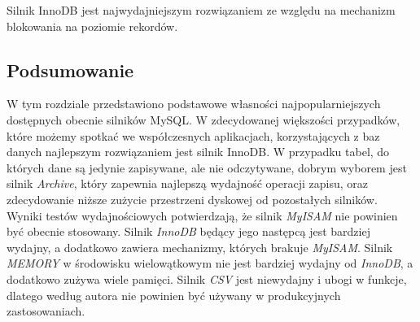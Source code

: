 Silnik InnoDB jest najwydajniejszym rozwiązaniem ze względu na mechanizm blokowania na poziomie rekordów.



\subsection{Podsumowanie}

W tym rozdziale przedstawiono podstawowe własności najpopularniejszych dostępnych obecnie silników MySQL. W zdecydowanej większości przypadków, które możemy spotkać we współczesnych aplikacjach, korzystających z baz danych najlepszym rozwiązaniem jest silnik InnoDB. W przypadku tabel, do których dane są jedynie zapisywane, ale nie odczytywane, dobrym wyborem jest silnik \textit{Archive}, który zapewnia najlepszą wydajność operacji zapisu, oraz zdecydowanie niższe zużycie przestrzeni dyskowej od pozostałych silników. Wyniki testów wydajnościowych potwierdzają, że silnik \textit{MyISAM} nie powinien być obecnie stosowany. Silnik \textit{InnoDB} będący jego następcą jest bardziej wydajny, a dodatkowo zawiera mechanizmy, których brakuje \textit{MyISAM}. Silnik \textit{MEMORY} w środowisku wielowątkowym nie jest bardziej wydajny od \textit{InnoDB}, a dodatkowo zużywa wiele pamięci. Silnik \textit{CSV} jest niewydajny i ubogi w funkcje, dlatego według autora nie powinien być używany w produkcyjnych zastosowaniach.